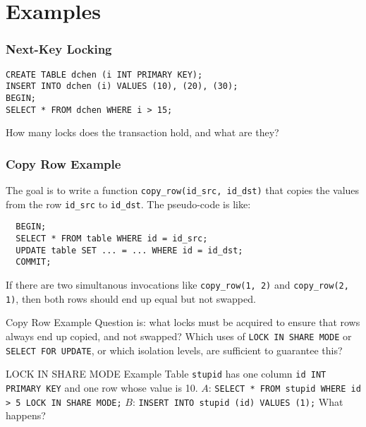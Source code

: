 \documentclass[14pt]{beamer}
\begin{document}
\section{Examples}

\begin{frame}[fragile]
  \frametitle{Next-Key Locking}
\begin{verbatim}
CREATE TABLE dchen (i INT PRIMARY KEY);
INSERT INTO dchen (i) VALUES (10), (20), (30);
BEGIN;
SELECT * FROM dchen WHERE i > 15;
\end{verbatim}
  How many locks does the transaction hold, and what are they?
\end{frame}

\begin{frame}[fragile]
  \frametitle{Copy Row Example}
  The goal is to write a function \texttt{copy\_row(id\_src, id\_dst)} that
  copies the values from the row \texttt{id\_src} to \texttt{id\_dst}. The
  pseudo-code is like:
\begin{verbatim}
  BEGIN;
  SELECT * FROM table WHERE id = id_src;
  UPDATE table SET ... = ... WHERE id = id_dst;
  COMMIT;
\end{verbatim}
  If there are two simultanous invocations like \texttt{copy\_row(1, 2)} and
  \texttt{copy\_row(2, 1)}, then both rows should end up equal but not swapped.
\end{frame}

\begin{frame}{Copy Row Example}
  Question is: what locks must be acquired to ensure that rows always end up
  copied, and not swapped?
  \newline
  \newline
  Which uses of \texttt{LOCK IN SHARE MODE} or
  \texttt{SELECT FOR UPDATE}, or which isolation levels, are sufficient to
  guarantee this?
\end{frame}

\begin{frame}{LOCK IN SHARE MODE Example}
  Table \texttt{stupid} has one column \texttt{id INT PRIMARY KEY} and one row
  whose value is 10.
  \newline
  \newline
  $A$: \texttt{SELECT * FROM stupid WHERE id > 5 LOCK IN SHARE MODE;}
  \newline
  \newline
  $B$: \texttt{INSERT INTO stupid (id) VALUES (1);}
  \newline
  \newline
  What happens?
\end{frame}
\end{document}
